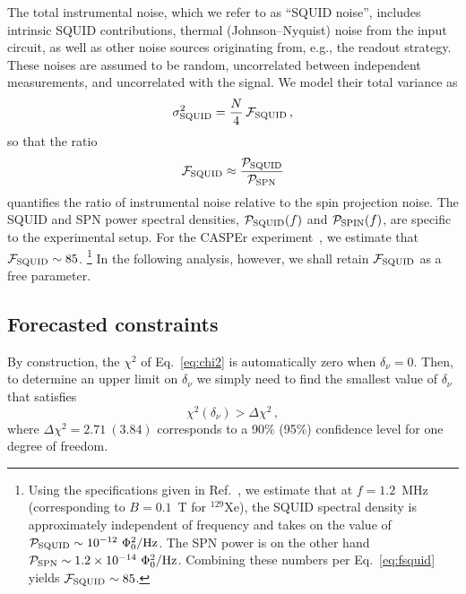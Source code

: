 \documentclass[aps,prd,10pt,twocolumn,superscriptaddress,floatfix,nofootinbib,amsmath,amssymb,altaffilletter,preprintnumbers]{revtex4-1}
\begin{document}
The total instrumental noise, which we refer to as ``SQUID noise'', includes intrinsic SQUID contributions, thermal (Johnson–Nyquist) noise from the input circuit, as well as other noise sources originating from, e.g., the readout strategy. These noises are assumed to be random, uncorrelated between independent measurements, and uncorrelated with the signal. We model their total variance as  
\begin{equation}
 \sigma_{\rm SQUID}^2 = \frac{N}{4}\, \mathcal{F}_{\rm SQUID} \,,
\end{equation} so that the ratio \begin{equation}
\mathcal{F}_{\rm SQUID} \approx \frac{\mathcal{P}_{\rm SQUID}}{\mathcal{P}_{\rm SPN}}
\label{eq:fsquid}
\end{equation} quantifies the ratio of instrumental noise relative to the spin projection noise. The SQUID and SPN power spectral densities, $\mathcal{P}_{\rm SQUID}(f)$ and $\mathcal{P}_{\rm SPIN}(f)$, are specific to the experimental setup.  For the CASPEr experiment~\cite{Walter:2025ldb}, we estimate that  $\mathcal{F}_{\rm SQUID} \sim 85$.%
%
\footnote{Using the specifications given in Ref.~\cite{Walter:2025ldb}, we estimate that at $f = 1.2$~MHz (corresponding to $B = 0.1$~T for $^{129}$Xe), the SQUID spectral density is approximately independent of frequency and takes on the value of $\mathcal{P}_{\rm SQUID} \sim 10^{-12}~\Phi_0^2/\mathrm{Hz}$. The SPN power is on the other hand $\mathcal{P}_{\rm SPN} \sim 1.2 \times 10^{-14}~\Phi_0^2/\mathrm{Hz}$.  Combining these numbers per Eq.~\eqref{eq:fsquid} yields $\mathcal{F}_{\rm SQUID} \sim 85$.}
%
In the following analysis, however, we shall retain $\mathcal{F}_{\rm SQUID}$ as a free parameter. 





\subsection{Forecasted constraints}

By construction, the $\chi^2$ of Eq.~\eqref{eq:chi2} is automatically zero when $\delta_\nu=0$.  Then, to determine an upper limit on $\delta_\nu$ we simply need to find the smallest value of $\delta_\nu$ that satisfies
\begin{equation}
    \chi^2(\delta_\nu) > \Delta\chi^2\, ,
\end{equation} 
where $\Delta\chi^2 = 2.71~(3.84)$ corresponds to a 90\% (95\%) confidence level for one degree of freedom. 
\end{document}

